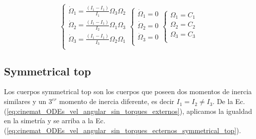 \documentclass[oneside,a4paper,english,links]{amca}
\begin{document}
\begin{equation}
\begin{cases}
    \dot{\Omega}_1=\frac{\left(I_1-I_1\right)}{I_1}\Omega_3\Omega_2\\
    \dot{\Omega}_2=\frac{\left(I_1-I_1\right)}{I_2}\Omega_1\Omega_3\\
    \dot{\Omega}_3=\frac{\left(I_1-I_1\right)}{I_3}\Omega_2\Omega_1\\
    \end{cases}
    \begin{cases}
    \dot{\Omega}_1=0\\
    \dot{\Omega}_2=0\\
    \dot{\Omega}_3=0\\
    \end{cases}
        \begin{cases}
    {\Omega}_1=C_1\\
    {\Omega}_2=C_2\\
    {\Omega}_3=C_3\\
    \end{cases}
    \label{eq:cinemat_ODEs_vel_angular_sin_torques_externos_spherical_top}
\end{equation}


\subsection{Symmetrical top}
\label{sec:cinemat_An\'alsis_momentos_angulares_Aplicaciones_Ec_Euler_symmetrical_top}

Los cuerpos symmetrical top son los cuerpos que poseen dos momentos de inercia similares y un $3^{er}$ momento de inercia diferente, es decir $I_1=I_2\neq I_3$. De la Ec.(\ref{eq:cinemat_ODEs_vel_angular_sin_torques_externos}), aplicamos la igualdad en la simetr\'ia y se arriba a la Ec.(\ref{eq:cinemat_ODEs_vel_angular_sin_torques_ecternos_symmetrical_top}).
\end{document}
